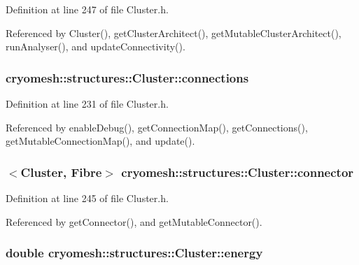 \-Definition at line 247 of file \-Cluster.\-h.



\-Referenced by \-Cluster(), get\-Cluster\-Architect(), get\-Mutable\-Cluster\-Architect(), run\-Analyser(), and update\-Connectivity().

\hypertarget{classcryomesh_1_1structures_1_1Cluster_ac614788bbfa9961f1f462d1caf7d0405}{
\subsubsection[{connections}]{ {\bf cryomesh\-::structures\-::\-Cluster\-::connections}}}\label{classcryomesh_1_1structures_1_1Cluster_ac614788bbfa9961f1f462d1caf7d0405}


\-Definition at line 231 of file \-Cluster.\-h.



\-Referenced by enable\-Debug(), get\-Connection\-Map(), get\-Connections(), get\-Mutable\-Connection\-Map(), and update().

\hypertarget{classcryomesh_1_1structures_1_1Cluster_aaaaac972efefc911d4550799c752730d}{
\subsubsection[{connector}]{$<${\bf \-Cluster}, {\bf \-Fibre}$>$ {\bf cryomesh\-::structures\-::\-Cluster\-::connector}}}\label{classcryomesh_1_1structures_1_1Cluster_aaaaac972efefc911d4550799c752730d}


\-Definition at line 245 of file \-Cluster.\-h.



\-Referenced by get\-Connector(), and get\-Mutable\-Connector().

\hypertarget{classcryomesh_1_1structures_1_1Cluster_a28fb86dc636571345e27da1cb544a939}{
\subsubsection[{energy}]{\setlength{\rightskip}{0pt plus 5cm}double {\bf cryomesh\-::structures\-::\-Cluster\-::energy}}}\label{classcryomesh_1_1structures_1_1Cluster_a28fb86dc636571345e27da1cb544a939}


